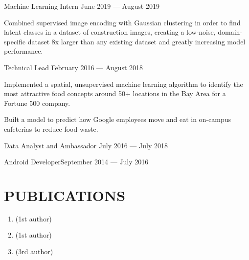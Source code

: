 \documentclass[10pt]{article}
\begin{document}
                {Machine Learning Intern}
                {June 2019 --- August 2019}
                    \begin{accomplishments}
                        \item Combined supervised image encoding with Gaussian clustering in order to find latent classes in a dataset of construction images, creating a low-noise, domain-specific dataset 8x larger than any existing dataset and greatly increasing model performance.
                    \end{accomplishments}

								{Technical Lead}
								{February 2016 --- August 2018}                  		
	                   \begin{accomplishments} 
	                    		\item Implemented a spatial, unsupervised machine learning algorithm to identify the most attractive food concepts around 50+ locations in the Bay Area for a Fortune 500 company.
                          \item Built a model to predict how Google employees move and eat in on-campus cafeterias to reduce food waste.
	                    \end{accomplishments}
	                    		
	   		
	   			{Data Analyst and Ambassador}
	   			{July 2016 --- July 2018}
        \vspace{0.5em}
                  	 
          {Android Developer}{September 2014 --- July 2016}
        \vspace{0.5em}
                  

\section*{PUBLICATIONS}
\vspace{-3.4em}

\begin{enumerate}
  \item {} (1st author)
  \item {} (1st author)
  \item {} (3rd author)
\end{enumerate}
\end{document}
